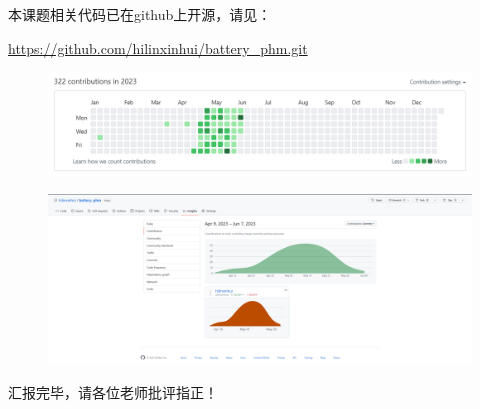 \documentclass{beamer}
\begin{document}
\begin{frame}
	\centering
	本课题相关代码已在github上开源，请见：

	\centering
	\url {https://github.com/hilinxinhui/battery_phm.git}

	\begin{figure}[htbp]
		\centering
		\includegraphics[scale=0.35]{figures/github_contribution_log.png}
	\end{figure}

	\begin{figure}[htbp]
		\centering
		\includegraphics[scale=0.15]{figures/github_contribution_log_2.png}
	\end{figure}

\end{frame}

\begin{frame}
	\LARGE \centering 汇报完毕，请各位老师批评指正！
\end{frame}
\end{document}
